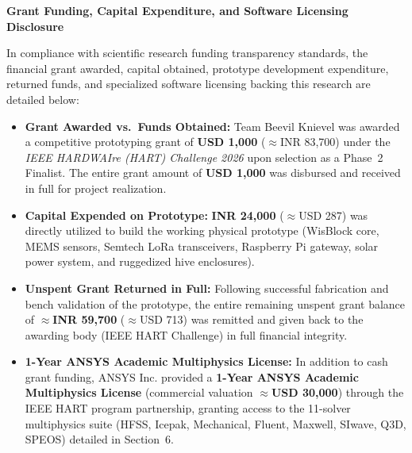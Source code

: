 \documentclass[12pt,a4paper]{article}
\begin{document}
\vspace{0.35cm}
{\large\bfseries\color{deepSlate} Grant Funding, Capital Expenditure, and Software Licensing Disclosure}\\[0.15cm]
{\small
In compliance with scientific research funding transparency standards, the financial grant awarded, capital obtained, prototype development expenditure, returned funds, and specialized software licensing backing this research are detailed below:

\begin{itemize}[leftmargin=1.2em, itemsep=1.5pt, topsep=2pt, parsep=0pt]
    \item \textbf{Grant Awarded vs.\ Funds Obtained:} Team Beevil Knievel was awarded a competitive prototyping grant of \textbf{USD 1,000} ($\approx$INR 83,700) under the \textit{IEEE HARDWAIre (HART) Challenge 2026} upon selection as a Phase~2 Finalist. The entire grant amount of \textbf{USD 1,000} was disbursed and received in full for project realization.
    \item \textbf{Capital Expended on Prototype:} \textbf{INR 24,000} ($\approx$USD 287) was directly utilized to build the working physical prototype (WisBlock core, MEMS sensors, Semtech LoRa transceivers, Raspberry Pi gateway, solar power system, and ruggedized hive enclosures).
    \item \textbf{Unspent Grant Returned in Full:} Following successful fabrication and bench validation of the prototype, the entire remaining unspent grant balance of $\approx$\textbf{INR 59,700} ($\approx$USD 713) was remitted and given back to the awarding body (IEEE HART Challenge) in full financial integrity.
    \item \textbf{1-Year ANSYS Academic Multiphysics License:} In addition to cash grant funding, ANSYS Inc. provided a \textbf{1-Year ANSYS Academic Multiphysics License} (commercial valuation $\approx$\textbf{USD 30,000}) through the IEEE HART program partnership, granting access to the 11-solver multiphysics suite (HFSS, Icepak, Mechanical, Fluent, Maxwell, SIwave, Q3D, SPEOS) detailed in Section~6.
\end{itemize}

}
\end{document}

